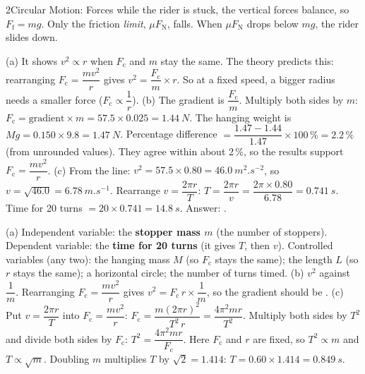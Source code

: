 \begin{chapteranswers}{2}{Circular Motion: Forces}
        while the rider is stuck, the vertical forces balance, so $F_\mathrm{f} = mg$. Only the
        friction \emph{limit}, $\mu F_\mathrm{N}$, falls. When $\mu F_\mathrm{N}$ drops below $mg$,
        the rider slides down.
  \item (a) It shows $v^2 \propto r$ when $F_\mathrm{c}$ and $m$ stay the same. The theory
        predicts this: rearranging $F_\mathrm{c} = \dfrac{mv^2}{r}$ gives
        $v^2 = \dfrac{F_\mathrm{c}}{m} \times r$. So at a fixed speed, a bigger radius needs a
        smaller force ($F_\mathrm{c} \propto \dfrac{1}{r}$).
        (b) The gradient is $\dfrac{F_\mathrm{c}}{m}$. Multiply both sides by $m$:
        $F_\mathrm{c} = \text{gradient} \times m = 57.5 \times 0.025 = \qty{1.44}{N}$.
        The hanging weight is $Mg = 0.150 \times 9.8 = \qty{1.47}{N}$.
        Percentage difference $= \dfrac{1.47 - 1.44}{1.47} \times 100\,\% = 2.2\,\%$ (from
        unrounded values). They agree within about 2\,\%, so the results support
        $F_\mathrm{c} = \dfrac{mv^2}{r}$.
        (c) From the line: $v^2 = 57.5 \times 0.80 = \qty{46.0}{m^2.s^{-2}}$, so
        $v = \sqrt{46.0} = \qty{6.78}{m.s^{-1}}$. Rearrange $v = \dfrac{2\pi r}{T}$:
        $T = \dfrac{2\pi r}{v} = \dfrac{2\pi \times 0.80}{6.78} = \qty{0.741}{s}$.
        Time for 20 turns $= 20 \times 0.741 = \qty{14.8}{s}$. Answer: .
  \item (a) Independent variable: the \textbf{stopper mass $m$} (the number of stoppers).
        Dependent variable: the \textbf{time for 20 turns} (it gives $T$, then $v$).
        Controlled variables (any two): the hanging mass $M$ (so $F_\mathrm{c}$ stays the same);
        the length $L$ (so $r$ stays the same); a horizontal circle; the number of turns timed.
        (b) $v^2$ against $\dfrac{1}{m}$. Rearranging $F_\mathrm{c} = \dfrac{mv^2}{r}$ gives
        $v^2 = F_\mathrm{c}\, r \times \dfrac{1}{m}$, so the gradient should be
        .
        (c) Put $v = \dfrac{2\pi r}{T}$ into $F_\mathrm{c} = \dfrac{mv^2}{r}$:
        $F_\mathrm{c} = \dfrac{m (2\pi r)^2}{T^2\, r} = \dfrac{4\pi^2 m r}{T^2}$. Multiply both
        sides by $T^2$ and divide both sides by $F_\mathrm{c}$:
        $T^2 = \dfrac{4\pi^2 m r}{F_\mathrm{c}}$. Here $F_\mathrm{c}$ and $r$ are fixed, so
        $T^2 \propto m$ and $T \propto \sqrt{m}$. Doubling $m$ multiplies $T$ by
        $\sqrt{2} = 1.414$: $T = 0.60 \times 1.414 = \qty{0.849}{s}$.

\end{chapteranswers}
